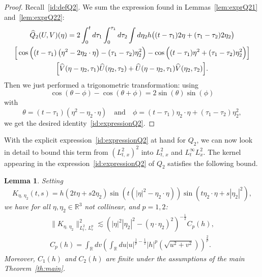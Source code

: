 \documentclass[10pt]{amsart}
\newtheorem{lemm}[theo]{Lemma}\newtheorem{prop}[theo]{Proposition}\newtheorem{coro}[theo]{Corollary}\newtheorem{conj}[theo]{Conjecture}
\theoremstyle{definition}\newtheorem{defi}[theo]{Definition}\newtheorem{rema}[theo]{Remark}\newtheorem{exam}[theo]{Example}\newtheorem{exem}[theo]{Example}\newtheorem{nota}[theo]{Notation}
\newcommand{\R}{\mathbb{R}}
\let\oldhat\hat
\renewcommand*{\hat}[1]{\mathchoice{\widehat{#1}}{\widehat{#1}}{\oldhat{#1}}{\oldhat{#1}}}
\begin{document}
\begin{proof}
Recall~\eqref{id:defQ2}. We sum the expression found in Lemmas~\ref{lem:exprQ21} and~\ref{lem:exprQ22}:
\begin{multline*}
\hat Q_2(U,V) (\eta)= 2 \int_{0}^t d\tau_1 \int_{0}^{\tau_1} d\tau_2 \int d\eta_2 h\big((t-\tau_1)2\eta + (\tau_1 - \tau_2) 2\eta_2\big) \\
\Big[\cos\Big((t-\tau_1)\left(\eta^2-2\eta_2\cdot \eta\right)-(\tau_1-\tau_2)\eta_2^2 \Big) - \cos\Big((t-\tau_1) \eta^2 + (\tau_1 - \tau_2)\eta_2^2\Big)\Big] \\
\Big[\hat V(\eta-\eta_2,\tau_1) \hat U (\eta_2,\tau_2) + \hat U(\eta-\eta_2,\tau_1) \hat V (\eta_2,\tau_2) \Big].
\end{multline*}
Then we just performed a trigonometric transformation: using
\[
\cos(\theta - \phi) - \cos(\theta + \phi) = 2\sin(\theta) \sin (\phi)
\]
with
\[
\theta = (t-\tau_1)\left(\eta^2-\eta_2\cdot \eta\right)\quad \text{and}\quad
\phi = (t-\tau_1)\eta_2\cdot \eta + (\tau_1 - \tau_2)\eta_2^2,
\]
we get the desired identity~\eqref{id:expressionQ2}.
\end{proof}


With the explicit expression~\eqref{id:expressionQ2} at hand for $Q_2$, we can now look in detail to bound this term from $(L^2_{t,\,x})^2$ into $L^2_{t,\,x}$ and $L^{\infty}_tL^2_x$. The kernel appearing in the expression~\eqref{id:expressionQ2} of $Q_2$ satisfies the following bound.



\begin{lemm}\label{lem-normK}
Setting
\begin{equation} \label{id:defK}
K_{\eta,\,\eta_2}(t,s) = h\left(2t\eta + s 2\eta_2 \right)
\sin \left(t\left(|\eta|^2-\eta_2\cdot \eta\right)\right) \sin\left(t\eta_2\cdot \eta + s|\eta_2|^2\right),
\end{equation}
we have for all $\eta,\eta_2\in \R^3$ not collinear, and $p=1,2$:
\begin{multline*}
\big\|K_{\eta,\,\eta_2}\big\|_{L^2_t,\,L^p_s}^2 \lesssim \left(|\eta|^2|\eta_2|^2 - \left(\eta\cdot\eta_2\right)^2\right)^{-\frac 12}C_p(h), \\
 C_p(h)=\int_{\R} dv \left(\int_{\R} du |u|^{\frac1p-\frac 12}|h|^p\left(\sqrt{u^2+v^2}\right) \right)^{\frac 2p}.
\end{multline*}
Moreover, $C_1(h)$ and $C_2(h)$ are finite under the assumptions of the main Theorem~\ref{th:main}.
\end{lemm}
\end{document}
